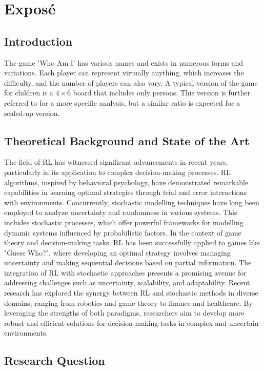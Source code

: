 \chapter{Exposé}

\section{Introduction}

The game 'Who Am I' has various names and exists in numerous forms and variations. Each player can represent virtually anything, which increases the difficulty, and the number of players can also vary. A typical version of the game for children is a $4 \times 6$ board that includes only persons. This version is further referred to for a more specific analysis, but a similar ratio is expected for a scaled-up version.

\section{Theoretical Background and State of the Art}
\label{sec:state-of-the-art}

The field of RL has witnessed significant advancements in recent years, particularly in its application to complex decision-making processes. RL algorithms, inspired by behavioral psychology, have demonstrated remarkable capabilities in learning optimal strategies through trial and error interactions with environments. Concurrently, stochastic modelling techniques have long been employed to analyze uncertainty and randomness in various systems. This includes stochastic processes, which offer powerful frameworks for modelling dynamic systems influenced by probabilistic factors. In the context of game theory and decision-making tasks, RL has been successfully applied to games like "Guess Who?", where developing an optimal strategy involves managing uncertainty and making sequential decisions based on partial information. The integration of RL with stochastic approaches presents a promising avenue for addressing challenges such as uncertainty, scalability, and adaptability. Recent research has explored the synergy between RL and stochastic methods in diverse domains, ranging from robotics and game theory to finance and healthcare. By leveraging the strengths of both paradigms, researchers aim to develop more robust and efficient solutions for decision-making tasks in complex and uncertain environments.


\section{Research Question}

